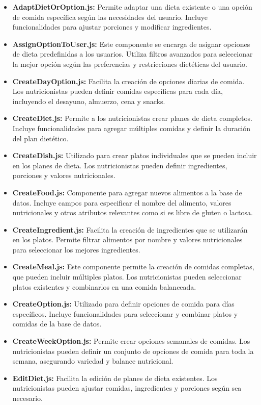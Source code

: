 \begin{itemize}
\item \textbf{AdaptDietOrOption.js:} Permite adaptar una dieta existente o una opción de comida específica según las necesidades del usuario. Incluye funcionalidades para ajustar porciones y modificar ingredientes.
\item \textbf{AssignOptionToUser.js:} Este componente se encarga de asignar opciones de dieta predefinidas a los usuarios. Utiliza filtros avanzados para seleccionar la mejor opción según las preferencias y restricciones dietéticas del usuario.
\item \textbf{CreateDayOption.js:} Facilita la creación de opciones diarias de comida. Los nutricionistas pueden definir comidas específicas para cada día, incluyendo el desayuno, almuerzo, cena y snacks.
\item \textbf{CreateDiet.js:} Permite a los nutricionistas crear planes de dieta completos. Incluye funcionalidades para agregar múltiples comidas y definir la duración del plan dietético.
\item \textbf{CreateDish.js:} Utilizado para crear platos individuales que se pueden incluir en los planes de dieta. Los nutricionistas pueden definir ingredientes, porciones y valores nutricionales.
\item \textbf{CreateFood.js:} Componente para agregar nuevos alimentos a la base de datos. Incluye campos para especificar el nombre del alimento, valores nutricionales y otros atributos relevantes como si es libre de gluten o lactosa.
\item \textbf{CreateIngredient.js:} Facilita la creación de ingredientes que se utilizarán en los platos. Permite filtrar alimentos por nombre y valores nutricionales para seleccionar los mejores ingredientes.
\item \textbf{CreateMeal.js:} Este componente permite la creación de comidas completas, que pueden incluir múltiples platos. Los nutricionistas pueden seleccionar platos existentes y combinarlos en una comida balanceada.
\item \textbf{CreateOption.js:} Utilizado para definir opciones de comida para días específicos. Incluye funcionalidades para seleccionar y combinar platos y comidas de la base de datos.
\item \textbf{CreateWeekOption.js:} Permite crear opciones semanales de comidas. Los nutricionistas pueden definir un conjunto de opciones de comida para toda la semana, asegurando variedad y balance nutricional.
\item \textbf{EditDiet.js:} Facilita la edición de planes de dieta existentes. Los nutricionistas pueden ajustar comidas, ingredientes y porciones según sea necesario.

\end{itemize}
